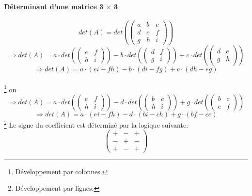 \documentclass[10pt,a4paper]{book}
\newcommand{\x}{$\times$ }
\begin{document}
\paragraph{Déterminant d'une matrice 3 \x 3}
\[det(A)= det\left( 
\begin{pmatrix}
 a & b & c \\
 d & e & f \\
 g & h & i
\end{pmatrix}\right)\]
\[\Rightarrow det(A) = a\cdot det\left(\begin{pmatrix}
e & f \\
h & i
\end{pmatrix}\right)
-b\cdot det\left(\begin{pmatrix}
d & f \\
g & i
\end{pmatrix}\right)
+c\cdot det\left(\begin{pmatrix}
d & e \\
g & h
\end{pmatrix}\right)\]
\[\Rightarrow det(A) = a\cdot (ei-fh) - b \cdot (di - fg) + c \cdot (dh -eg)\]\\
\footnote{Développement par colonnes.}
ou
\[\Rightarrow det(A) = a\cdot det\left(\begin{pmatrix}
e & f \\
h & i
\end{pmatrix}\right)
-d\cdot det\left(\begin{pmatrix}
b & c \\
h & i
\end{pmatrix}\right)
+g\cdot det\left(\begin{pmatrix}
b & c \\
e & f
\end{pmatrix}\right)\]
\[\Rightarrow det(A) = a\cdot (ei-fh) - d \cdot (bi - ch) + g \cdot (bf - ce)\]\footnote{Développement par lignes.}
Le signe du coefficient est déterminé par la logique suivante:
\[\begin{pmatrix}
+ & - & + \\
- & + & - \\
+ & - & +
\end{pmatrix}\]
\end{document}
